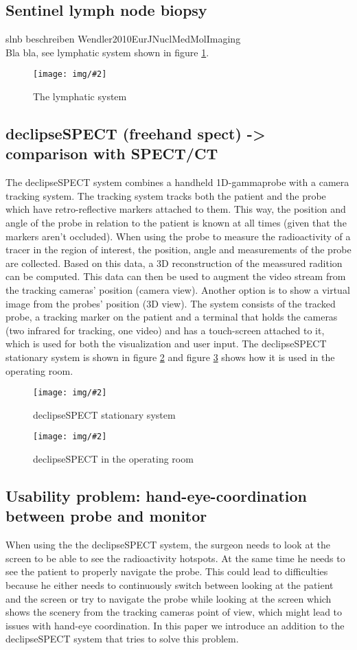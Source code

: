 \documentclass{scrartcl}
\newcommand{\red}[1]{{\color{red} #1}}
\newcommand{\graphic}[3][width=\linewidth] %
{
  \begin{figure}[h!t]
    \centering
    \texttt{[image: img/\#2]}
    \caption{#3}
    \label{fig:#2}
  \end{figure}
}
\newcommand{\refFigure}[1]{figure \ref{fig:#1}}
\begin{document}
\subsection{Sentinel lymph node biopsy}
\red{slnb beschreiben Wendler2010EurJNuclMedMolImaging}\\
Bla bla, see lymphatic system shown in \refFigure{lymphatic-system}.
\graphic[scale=.7]{lymphatic-system}{The lymphatic system}


\subsection{declipseSPECT (freehand spect) -> comparison with SPECT/CT}
The declipseSPECT system combines a handheld 1D-gammaprobe with a camera tracking system. The tracking system tracks both the patient and the probe which have retro-reflective markers attached to them. This way, the position and angle of the probe in relation to the patient is known at all times (given that the markers aren't occluded). When using the probe to measure the radioactivity of a tracer in the region of interest, the position, angle and measurements of the probe are collected. Based on this data, a 3D reconstruction of the meassured radition can be computed.
This data can then be used to augment the video stream from the tracking cameras' position (camera view). Another option is to show a virtual image from the probes' position (3D view).
The system consists of the tracked probe, a tracking marker on the patient and a terminal that holds the cameras (two infrared for tracking, one video) and has a touch-screen attached to it, which is used for both the visualization and user input. The declipseSPECT stationary system is shown in \refFigure{declipseSPECT} and \refFigure{declipseSPECT-OR} shows how it is used in the operating room.
\graphic[scale=.7]{declipseSPECT}{declipseSPECT stationary system}
\graphic[scale=.7]{declipseSPECT-OR}{declipseSPECT in the operating room}


\subsection{Usability problem: hand-eye-coordination between probe and monitor}
When using the the declipseSPECT system, the surgeon needs to look at the screen to be able to see the radioactivity hotspots. At the same time he needs to see the patient to properly navigate the probe. This could lead to difficulties because he either needs to continuously switch between looking at the patient and the screen or try to navigate the probe while looking at the screen which shows the scenery from the tracking cameras point of view, which might lead to issues with hand-eye coordination.
In this paper we introduce an addition to the declipseSPECT system that tries to solve this problem.
\end{document}
